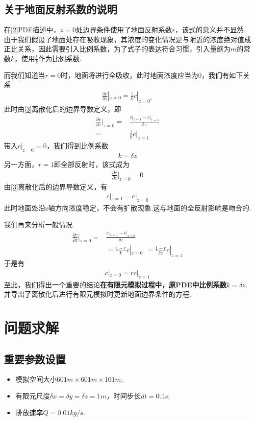 \documentclass{article}
\begin{document}
	\subsection{关于地面反射系数的说明}\label{4}
	在\ref{2}PDE描述中，$z=0$处边界条件使用了地面反射系数$r$，该式的意义并不显然.由于我们假设了地面处存在吸收现象，其浓度的变化情况是与附近的浓度绝对值成正比关系，因此需要引入比例系数，为了式子的表达符合习惯，引入量纲为$m$的常数$k$，使用$\frac{1}{k}$作为比例系数.
	
	而我们知道当$r=0$时，地面将进行全吸收，此时地面浓度应当为0，我们有如下关系
	\begin{align*}
		\frac{\partial c}{\partial z}|_{z=0} = \frac{1}{k}c|_{z=0^+}
	\end{align*}
	此时由\ref{3}离散化后的边界导数定义，即
	\begin{align*}
		\frac{\partial c}{\partial z}|_{z=0} =& \frac{c|_{z=1}-c|_{z=0}}{\delta z} \\
		=& \frac{1}{k}c|_{z=1}
	\end{align*}
	带入$c|_{z=0}=0$，我们得到比例系数
	\begin{align*}
		k=\delta z
	\end{align*}
	另一方面，$r=1$即全部反射时，该式成为
	\begin{align*}
		\frac{\partial c}{\partial z}|_{z=0} = 0
	\end{align*}
	由\ref{3}离散化后的边界导数定义，有
	\begin{align*}
		c|_{z=1}=c|_{z=0}
	\end{align*}
	此时地面处沿z轴方向浓度稳定，不会有扩散现象.这与地面的全反射影响是吻合的.
	
	我们再来分析一般情况
	\begin{align*}
		\frac{\partial c}{\partial z}|_{z=0} =& \frac{c|_{z=1}-c|_{z=0}}{\delta z}\\
		& = \frac{1-r}{k} c|_{z=0^+} = \frac{1-r}{\delta z} c|_{z=1}
	\end{align*}
	于是有
	\begin{align*}
		c|_{z=0} = rc|_{z=1}
	\end{align*}
	至此，我们得出一个重要的结论\textbf{在有限元模拟过程中，原PDE中比例系数$k=\delta z$}.并导出了离散化后进行有限元模拟时更新地面边界条件的方程.

	\section{问题求解}
	\subsection{重要参数设置}
	\begin{itemize}
		\item 模拟空间大小$601m\times601m\times101m$;
		\item 有限元尺度$\delta x=\delta y=\delta z = 1m$，时间步长$dt=0.1s$;
		\item 排放速率$Q=0.01 kg/s$.
	\end{itemize}
\end{document}
